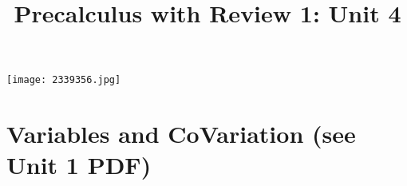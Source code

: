 \documentclass[handout]{xourse}
\title{Precalculus with Review 1: Unit 4}
\begin{document}
\texttt{[image: 2339356.jpg]}
\maketitle


	





\part{Variables and CoVariation (see Unit 1 PDF)}  %
%
%
%
%
%
%
%
%
\end{document}
